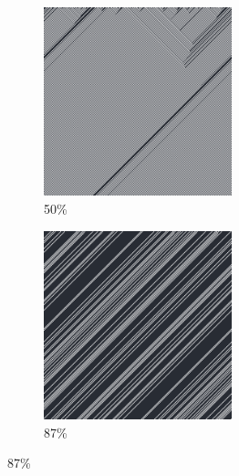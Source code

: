 \documentclass[12pt, fleqn]{report}                             %
\theoremstyle{break}                                            %
\begin{document}
\begin{figure}[ht!]
\begin{subfigure}[b]{0.4\linewidth}
          \includegraphics[width=0.6\textwidth]{Images/14/c.png}
          \caption{50\%}
        \end{subfigure}
        \begin{subfigure}[b]{0.4\linewidth}
          \includegraphics[width=0.6\textwidth]{Images/14/d.png}
          \caption{87\%}
        \end{subfigure}
      \end{figure}
\end{document}
